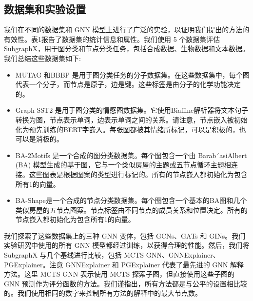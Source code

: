 \documentclass[final]{cvpr}
\begin{document}
\subsection{数据集和实验设置}

我们在不同的数据集和 GNN 模型上进行了广泛的实验，以证明我们提出的方法的有效性。表1报告了数据集的统计信息和属性。我们使用 5 个数据集评估 SubgraphX，用于图分类和节点分类任务，包括合成数据、生物数据和文本数据。我们总结这些数据集如下:

\begin{itemize}
\item MUTAG  和BBBP 是用于图分类任务的分子数据集。在这些数据集中，每个图代表一个分子，而节点是原子，边是键。这些标签是由分子的化学功能决定的。
\item Graph-SST2 是用于图分类的情感图数据集。它使用Biaffine解析器将文本句子转换为图，节点表示单词，边表示单词之间的关系。请注意，节点嵌入被初始化为预先训练的BERT字嵌入。每张图都被其情绪所标记，可以是积极的，也可以是消极的。
\item BA-2Motifs 是一个合成的图分类数据集。每个图包含一个由 Barab´asiAlbert (BA) 模型生成的基于图，它与一个类似房屋的主题或五节点循环主题相连接。这些图表是根据图案的类型进行标记的。所有的节点嵌入都初始化为包含所有1的向量。
\item BA-Shape是一个合成的节点分类数据集。每个图包含一个基本的BA图和几个类似房屋的五节点图案。节点标签由不同节点的成员关系和位置决定。所有的节点嵌入都初始化为包含所有1的向量。
\end{itemize}

我们探索了这些数据集上的三种 GNN 变体，包括 GCNs、GATs 和 GINs。我们实验研究中使用的所有 GNN 模型都经过训练，以获得合理的性能。然后，我们将 SubgraphX 与几个基线进行比较，包括 MCTS GNN、GNNExplainer、PGExplainer。注意 GNNExplainer 和 PGExplainer 代表了最先进的 GNN 解释方法。这里 MCTS GNN 表示使用 MCTS 探索子图，但直接使用这些子图的 GNN 预测作为评分函数的方法。我们谨指出，所有方法都是与公平的设置相比较的。我们使用相同的数字来控制所有方法的解释中的最大节点数。
\end{document}
